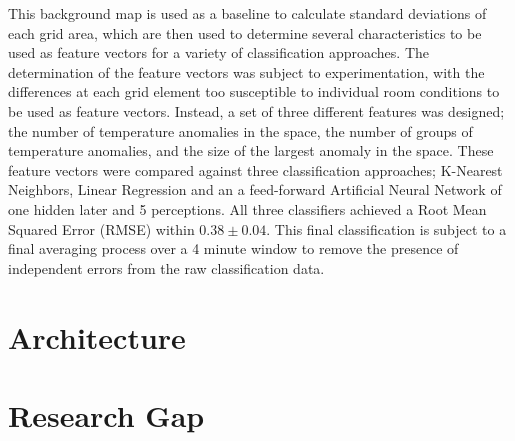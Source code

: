 \documentclass[../thesis/thesis.tex]{subfiles}
\begin{document}
This background map is used as a baseline to calculate standard deviations of each grid area, which are then used to determine several characteristics to be used as feature vectors for a variety of classification approaches. The determination of the feature vectors was subject to experimentation, with the differences at each grid element too susceptible to individual room conditions to be used as feature vectors. Instead, a set of three different features was designed; the number of temperature anomalies in the space, the number of groups of temperature anomalies, and the size of the largest anomaly in the space. These feature vectors were compared against three classification approaches; K-Nearest Neighbors, Linear Regression and an a feed-forward Artificial Neural Network of one hidden later and 5 perceptions. All three classifiers achieved a Root Mean Squared Error (RMSE) within $0.38\pm0.04$. This final classification is subject to a final averaging process over a 4 minute window to remove the presence of independent errors from the raw classification data.

\section{Architecture}
\label{sec:litreview:architecture}


\section{Research Gap}
\label{sec:litreview:researchgap}



\end{document}
